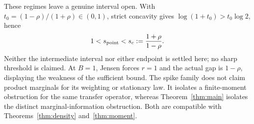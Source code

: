 These regimes leave a genuine interval open. With
$t_0=(1-\rho)/(1+\rho)\in(0,1)$, strict concavity gives
$\log(1+t_0)>t_0\log2$, hence
\[
 1<s_{\rm point}<s_c:=\frac{1+\rho}{1-\rho}.
\]
Neither the intermediate interval nor either endpoint is settled here;
no sharp threshold is claimed. At $B=1$, Jensen forces $r=1$ and the
actual gap is $1-\rho$, displaying the weakness of the sufficient bound.
The spike family does not claim product marginals for its weighting or
stationary law. It isolates a finite-moment obstruction for the same
transfer operator, whereas Theorem~\ref{thm:main} isolates the distinct
marginal-information obstruction. Both are compatible with
Theorems~\ref{thm:density} and~\ref{thm:moment}.
